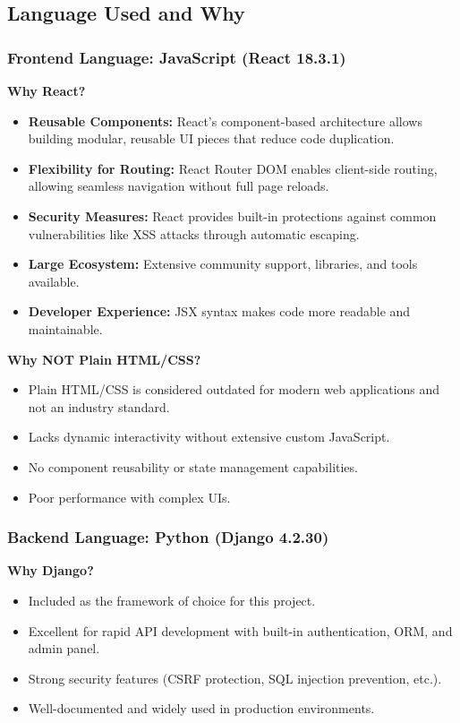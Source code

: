 \documentclass[12pt, a4paper]{article}
\begin{document}
\subsection{Language Used and Why}
\subsubsection{Frontend Language: JavaScript (React 18.3.1)}

\textbf{Why React?}

\begin{itemize}
  \item \textbf{Reusable Components:} React's component-based architecture allows building modular, reusable UI pieces that reduce code duplication.
  \item \textbf{Flexibility for Routing:} React Router DOM enables client-side routing, allowing seamless navigation without full page reloads.
  \item \textbf{Security Measures:} React provides built-in protections against common vulnerabilities like XSS attacks through automatic escaping.
  \item \textbf{Large Ecosystem:} Extensive community support, libraries, and tools available.
  \item \textbf{Developer Experience:} JSX syntax makes code more readable and maintainable.
\end{itemize}

\textbf{Why NOT Plain HTML/CSS?}

\begin{itemize}
  \item Plain HTML/CSS is considered outdated for modern web applications and not an industry standard.
  \item Lacks dynamic interactivity without extensive custom JavaScript.
  \item No component reusability or state management capabilities.
  \item Poor performance with complex UIs.
\end{itemize}
\subsubsection{Backend Language: Python (Django 4.2.30)}

\textbf{Why Django?}

\begin{itemize}
  \item Included as the framework of choice for this project.
  \item Excellent for rapid API development with built-in authentication, ORM, and admin panel.
  \item Strong security features (CSRF protection, SQL injection prevention, etc.).
  \item Well-documented and widely used in production environments.
\end{itemize}
\end{document}

